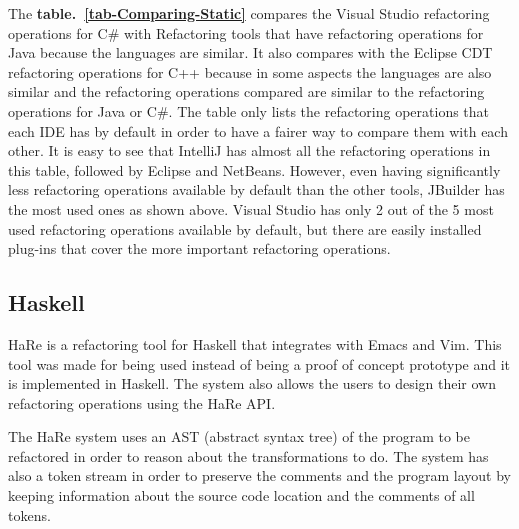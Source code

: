 The {\bf table.~\ref{tab-Comparing-Static}} compares the Visual Studio refactoring operations for C\# with Refactoring tools that have refactoring operations for Java because the languages are similar. It also compares with the Eclipse CDT  refactoring operations for C++ because in some aspects the languages are also similar and the refactoring operations compared are similar to the refactoring operations for Java or C\#. 
The table only lists the refactoring operations that each IDE has by default in order to have a fairer way to compare them with each other.
It is easy to see that IntelliJ has almost all the refactoring operations in this table, followed by Eclipse and NetBeans.
However, even having significantly less refactoring operations available by default than the other tools, JBuilder\cite{armstrong1998jbuilder} has the most used ones as shown above.
Visual Studio has only 2 out of the 5 most used refactoring operations available by default, but there are easily installed plug-ins that cover the more important refactoring operations. 



\subsection{Haskell}

HaRe \cite{thompson2005refactoring} is a refactoring tool for Haskell that integrates with Emacs and Vim.
This tool was made for being used instead of being a proof of concept prototype and it is implemented in Haskell.
The system also allows the users to design their own refactoring operations using the HaRe API.

The HaRe system uses an AST (abstract syntax tree) of the program to be refactored in order to reason about the transformations to do.
The system has also a token stream in order to preserve the comments and the program layout by keeping information about the source code location and the comments of all tokens.



